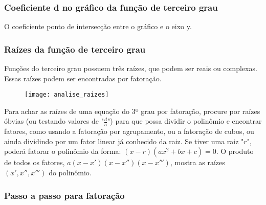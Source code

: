 \documentclass[../resumo.tex]{subfiles}
\begin{document}
	\subsubsection{Coeficiente d no gráfico da função de terceiro grau}

	O coeficiente ponto de intersecção entre o gráfico e o eixo y.



	\subsubsection{Raízes da função de terceiro grau}

	Funções do terceiro grau possuem três raízes, que podem ser reais ou complexas. Essas
	raízes podem ser encontradas por fatoração.

	\begin{figure}[H]
		\centering
		\texttt{[image: analise\_raizes]}
		\label{fig:analise_raizes}
	\end{figure}

	Para achar as raízes de uma equação do 3º grau por fatoração, procure por raízes
	óbvias (ou testando valores de "$\frac{d}{a}$") para que possa dividir o polinômio e encontrar fatores, como
	usando a fatoração por agrupamento, ou a fatoração de cubos, ou ainda dividindo por um fator
	linear já conhecido da raiz. Se tiver uma raiz "$r$", poderá fatorar o polinômio da forma:
	$(x - r) (ax^2+ bx + c) = 0$. O produto de todos os fatores, $a(x - x')(x - x'')(x - x''')$, mostra as raízes $(x', x'', x''')$
	do polinômio.

	\subsubsection{Passo a passo para fatoração}
\end{document}
